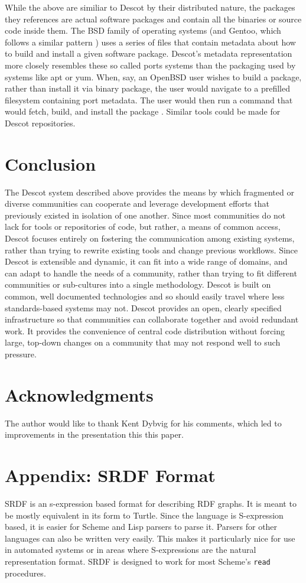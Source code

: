 \documentclass[9pt,cm,twocolumn,preprint]{sigplanconf}
\begin{document}
While the above are similiar to Descot by their distributed nature, 
the packages they references are actual software packages and 
contain all the binaries or source code inside them. The BSD 
family of operating systems (and Gentoo, which follows a similar 
pattern \cite{gentoo}) uses a series of files that contain 
metadata about how to build and install a given software package. 
Descot's metadata representation more closely resembles these 
so called ports systems than the packaging used by systems like 
apt or yum. When, say, an OpenBSD 
user wishes to build a package, 
rather than install it via binary package, the user would 
navigate to a prefilled filesystem containing port metadata. 
The user would then run a command that would fetch, build, 
and install the package \cite{openbsd}. 
Similar tools could be made for Descot repositories. 

\section{Conclusion}
\label{conclusion}
The Descot system described above provides the means by which 
fragmented or diverse communities can cooperate and leverage 
development efforts that previously existed in isolation of 
one another. 
Since most communities do not lack for tools or repositories 
of code, but rather, a means of common access, Descot focuses 
entirely on fostering the communication among existing 
systems, rather than trying to rewrite existing tools and 
change previous workflows. 
Since Descot is extensible and dynamic, it can fit into a 
wide range of domains, and can adapt to handle the needs of 
a community, rather than trying to fit different communities 
or sub-cultures into a single methodology. 
Descot is built on common, well documented technologies 
and so should easily travel where less standards-based 
systems may not. 
Descot provides an open, clearly specified infrastructure so that
communities can collaborate together and avoid redundant 
work. It provides the convenience of central code distribution 
without forcing large, top-down changes on a community that 
may not respond well to such pressure.

\section{Acknowledgments}%
The author would like to thank Kent Dybvig for his comments, 
which led to improvements in the presentation this this paper. 




\vfil\break
\section*{Appendix: SRDF Format}
\label{srdf}
SRDF is an s-expression based format for describing RDF graphs.  It is
meant to be mostly equivalent in its form to Turtle. Since the language
is S-expression based, it is easier for Scheme and Lisp parsers to
parse it. Parsers for other languages can also be written very
easily. This makes it particularly nice for use in automated systems
or in areas where S-expressions are the natural representation format.
SRDF is designed to work for most Scheme's {\tt read} procedures. 
\end{document}
